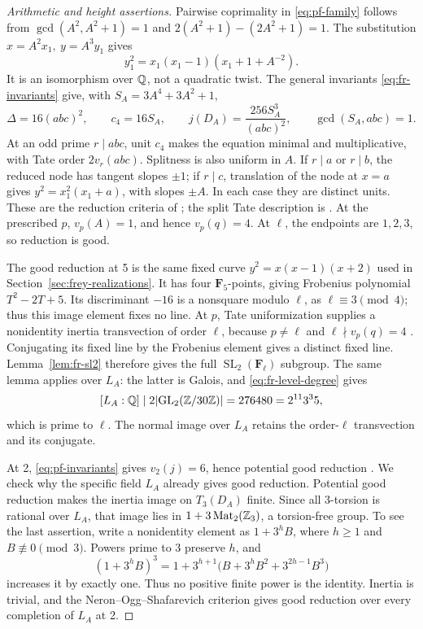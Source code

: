 \begin{proof}[Arithmetic and height assertions]
Pairwise coprimality in \eqref{eq:pf-family} follows from
\(\gcd(A^2,A^2+1)=1\) and \(2(A^2+1)-(2A^2+1)=1\).
The substitution \(x=A^2x_1,\ y=A^3y_1\) gives
\[
 y_1^2=x_1(x_1-1)(x_1+1+A^{-2}).
\]
It is an isomorphism over \(\mathbb Q\), not a quadratic twist.
The general invariants \eqref{eq:fr-invariants} give, with
\(S_A=3A^4+3A^2+1\),
\begin{equation}\label{eq:pf-invariants}
 \Delta=16(abc)^2,\qquad c_4=16S_A,\qquad
 j(D_A)=\frac{256S_A^3}{(abc)^2},\qquad \gcd(S_A,abc)=1.
\end{equation}
At an odd prime \(r\mid abc\), unit \(c_4\) makes the equation minimal
and multiplicative, with Tate order \(2v_r(abc)\).
Splitness is also uniform in \(A\). If \(r\mid a\) or \(r\mid b\),
the reduced node has tangent slopes \(\pm1\); if \(r\mid c\), translation
of the node at \(x=a\) gives \(y^2=x_1^2(x_1+a)\), with slopes \(\pm A\).
In each case they are distinct units.
These are the reduction criteria of
\cite[Chapter~VII, Proposition~5.1]{Silverman}; the split Tate
description is \cite[Theorems~1--2]{KedlayaTate}.
At the prescribed \(p\), \(v_p(A)=1\), and hence \(v_p(q)=4\).
At \(\ell\), the endpoints are \(1,2,3\), so reduction is good.

The good reduction at 5 is the same fixed curve
\(y^2=x(x-1)(x+2)\) used in Section~\ref{sec:frey-realizations}.
It has four \(\mathbf F_5\)-points, giving Frobenius polynomial
\(T^2-2T+5\). Its discriminant \(-16\) is a nonsquare modulo \(\ell\),
as \(\ell\equiv3\pmod4\); thus this image element fixes no line.
At \(p\), Tate uniformization supplies a nonidentity inertia
transvection of order \(\ell\), because \(p\ne\ell\) and
\(\ell\nmid v_p(q)=4\)
\cite[Proposition~3]{KedlayaTate}.
Conjugating its fixed line by the Frobenius element gives a distinct
fixed line. Lemma~\ref{lem:fr-sl2} therefore gives the full
\(\operatorname{SL}_2(\mathbf F_\ell)\) subgroup.
The same lemma applies over \(L_A\): the latter is Galois, and
\eqref{eq:fr-level-degree} gives
\begin{equation}\label{eq:pf-level-degree}
 [L_A:\mathbb Q]\mid 2\lvert\operatorname{GL}_2(\mathbb Z/30\mathbb Z)\rvert
       =276480=2^{11}3^3 5,
\end{equation}
which is prime to \(\ell\). The normal image over \(L_A\) retains the
order-\(\ell\) transvection and its conjugate.

At 2, \eqref{eq:pf-invariants} gives \(v_2(j)=6\), hence potential good
reduction \cite[Chapter~VII, Proposition~5.5]{Silverman}. We check why
the specific field \(L_A\) already gives good reduction. Potential good
reduction makes the inertia image on \(T_3(D_A)\) finite. Since all
3-torsion is rational over \(L_A\), that image lies in
\(1+3\operatorname{Mat}_2(\mathbb Z_3)\), a torsion-free group. To see the last assertion,
write a nonidentity element as \(1+3^hB\), where \(h\ge1\) and
\(B\not\equiv0\pmod3\). Powers prime to 3 preserve \(h\), and
\[
 (1+3^hB)^3
 =1+3^{h+1}\bigl(B+3^hB^2+3^{2h-1}B^3\bigr)
\]
increases it by exactly one. Thus no positive finite power is the
identity. Inertia is trivial, and the Neron--Ogg--Shafarevich criterion
\cite[Chapter~VII, Theorem~7.1]{Silverman} gives good reduction over
every completion of \(L_A\) at 2.


\end{proof}
